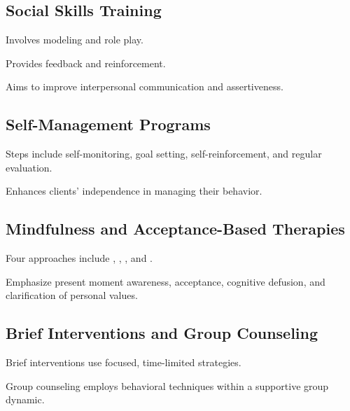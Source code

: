 \subsection{Social Skills Training}
\begin{coloredlist}
    \item Involves modeling and role play.
    \item Provides feedback and reinforcement.
    \item Aims to improve interpersonal communication and assertiveness.
\end{coloredlist}

\subsection{Self-Management Programs}
\begin{coloredlist}
    \item Steps include self-monitoring, goal setting, self-reinforcement, and regular evaluation.
    \item Enhances clients' independence in managing their behavior.
\end{coloredlist}

\subsection{Mindfulness and Acceptance-Based Therapies}
\begin{coloredlist}
    \item Four approaches include , , , and .
    \item Emphasize present moment awareness, acceptance, cognitive defusion, and clarification of personal values.
\end{coloredlist}

\subsection{Brief Interventions and Group Counseling}
\begin{coloredlist}
    \item Brief interventions use focused, time-limited strategies.
    \item Group counseling employs behavioral techniques within a supportive group dynamic.
\end{coloredlist}

